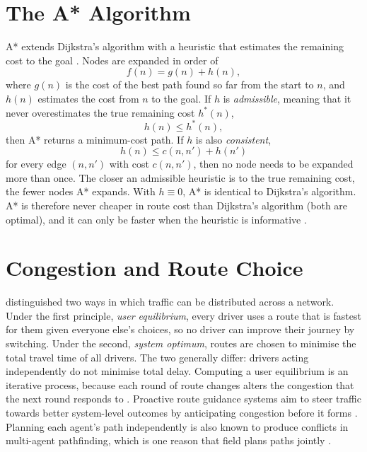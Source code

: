 \documentclass[12pt]{report}
\begin{document}
\section{The A* Algorithm}

A* extends Dijkstra's algorithm with a heuristic that estimates the remaining cost to the goal \citep{hart1968astar}. Nodes are expanded in order of
\begin{equation}
f(n) = g(n) + h(n),
\label{eq:astar}
\end{equation}
where $g(n)$ is the cost of the best path found so far from the start to $n$, and $h(n)$ estimates the cost from $n$ to the goal. If $h$ is \emph{admissible}, meaning that it never overestimates the true remaining cost $h^*(n)$,
\begin{equation}
h(n) \leq h^*(n),
\end{equation}
then A* returns a minimum-cost path. If $h$ is also \emph{consistent},
\begin{equation}
h(n) \leq c(n,n') + h(n')
\end{equation}
for every edge $(n,n')$ with cost $c(n,n')$, then no node needs to be expanded more than once. The closer an admissible heuristic is to the true remaining cost, the fewer nodes A* expands. With $h \equiv 0$, A* is identical to Dijkstra's algorithm. A* is therefore never cheaper in route cost than Dijkstra's algorithm (both are optimal), and it can only be faster when the heuristic is informative \citep{hart1968astar,candra2020dijkstra}.

\section{Congestion and Route Choice}

\citet{wardrop1952} distinguished two ways in which traffic can be distributed across a network. Under the first principle, \emph{user equilibrium}, every driver uses a route that is fastest for them given everyone else's choices, so no driver can improve their journey by switching. Under the second, \emph{system optimum}, routes are chosen to minimise the total travel time of all drivers. The two generally differ: drivers acting independently do not minimise total delay. Computing a user equilibrium is an iterative process, because each round of route changes alters the congestion that the next round responds to \citep{sheffi1985urban}. Proactive route guidance systems aim to steer traffic towards better system-level outcomes by anticipating congestion before it forms \citep{angelelli2016proactive}. Planning each agent's path independently is also known to produce conflicts in multi-agent pathfinding, which is one reason that field plans paths jointly \citep{standley2010cooperative}.
\end{document}
